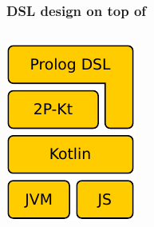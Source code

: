 \documentclass[presentation]{beamer}
\begin{document}
\begin{frame}%
    \frametitle{DSL design on top of \twopkt}

    \begin{columns}
        \centering
        \begin{column}{.15\linewidth}
            \centering
            \includegraphics[width=\linewidth]{img/layers}
        \end{column}
        \hfill
        \begin{column}{.84\linewidth}

\end{column}
\end{columns}
\end{frame}
\end{document}
